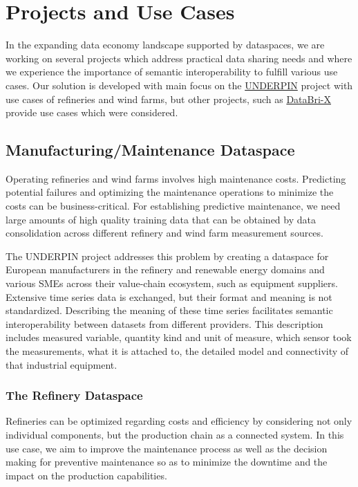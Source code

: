 \documentclass[manuscript,screen]{acmart}
\begin{document}
\section{Projects and Use Cases}\label{projects-and-use-cases}

In the expanding data economy landscape supported by dataspaces, we are
working on several projects which address practical data sharing needs
and where we experience the importance of semantic interoperability to
fulfill various use cases. Our solution is developed with main focus on
the \href{https://underpinproject.eu/}{UNDERPIN} project with use cases
of refineries and wind farms, but other projects, such as
\href{https://databri-x.eu/}{DataBri-X} provide use cases which were
considered.

\subsection{Manufacturing/Maintenance
Dataspace}\label{manufacturingmaintenance-dataspace}

Operating refineries and wind farms involves high maintenance costs.
Predicting potential failures and optimizing the maintenance operations
to minimize the costs can be business-critical. For establishing
predictive maintenance, we need large amounts of high quality training
data that can be obtained by data consolidation across different
refinery and wind farm measurement sources.

The UNDERPIN project addresses this problem by creating a dataspace for
European manufacturers in the refinery and renewable energy domains and
various SMEs across their value-chain ecosystem, such as equipment
suppliers. Extensive time series data is exchanged, but their format and
meaning is not standardized. Describing the meaning of these time series
facilitates semantic interoperability between datasets from different
providers. This description includes measured variable, quantity kind
and unit of measure, which sensor took the measurements, what it is
attached to, the detailed model and connectivity of that industrial
equipment.

\subsubsection{The Refinery Dataspace}\label{the-refinery-dataspace}

Refineries can be optimized regarding costs and efficiency by
considering not only individual components, but the production chain as
a connected system. In this use case, we aim to improve the maintenance
process as well as the decision making for preventive maintenance so as
to minimize the downtime and the impact on the production capabilities.
\end{document}

